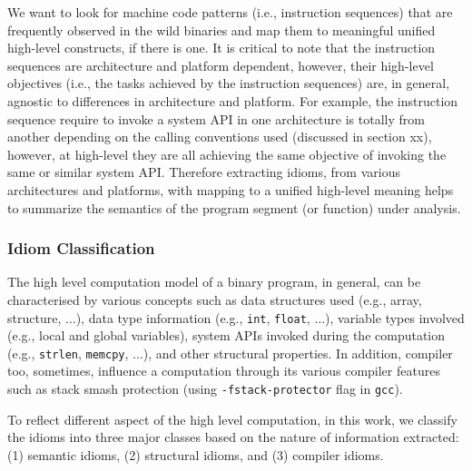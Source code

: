We want to look for machine code patterns (i.e., instruction sequences) that are frequently observed in the wild binaries and map them to meaningful unified high-level constructs, if there is one. It is critical to note that the instruction sequences are architecture and platform dependent, however, their high-level objectives (i.e., the tasks achieved by the instruction sequences) are, in general, agnostic to differences in architecture and platform. For example, the instruction sequence require to invoke a system API in one architecture is totally from another depending on the calling conventions used (discussed in section xx), however, at high-level they are all achieving the same objective of invoking the same or similar system API.
Therefore extracting idioms, from various architectures and platforms, with mapping to a unified high-level meaning helps to summarize the semantics of the program segment (or function) under analysis.


\subsubsection{Idiom Classification}
The high level computation model of a binary program, in general, can be characterised by various concepts such as data structures used (e.g., array, structure, $\ldots$), data type information (e.g., \texttt{int}, \texttt{float}, $\ldots$), variable types involved (e.g., local and global variables), system APIs invoked during the computation (e.g., \texttt{strlen}, \texttt{memcpy}, $\ldots$), and other structural properties. In addition, compiler too, sometimes, influence a computation through its various compiler features such as stack smash protection (using \texttt{-fstack-protector} flag in \texttt{gcc}).

 
To reflect different aspect of the high level computation, 
in this work, we classify the idioms into three major classes based on the nature of information extracted: (1) semantic idioms, (2) structural idioms, and (3) compiler idioms. 

